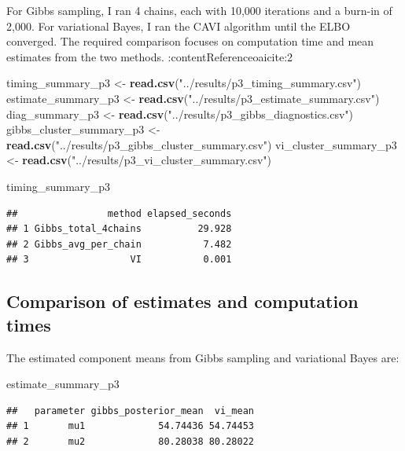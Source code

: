 \documentclass[
]{article}
\newenvironment{Shaded}{\begin{snugshade}}{\end{snugshade}}
\newcommand{\FunctionTok}[1]{\textcolor[rgb]{0.13,0.29,0.53}{\textbf{#1}}}
\newcommand{\NormalTok}[1]{#1}
\newcommand{\OtherTok}[1]{\textcolor[rgb]{0.56,0.35,0.01}{#1}}
\newcommand{\StringTok}[1]{\textcolor[rgb]{0.31,0.60,0.02}{#1}}
\begin{document}
For Gibbs sampling, I ran 4 chains, each with 10,000 iterations and a
burn-in of 2,000. For variational Bayes, I ran the CAVI algorithm until
the ELBO converged. The required comparison focuses on computation time
and mean estimates from the two methods. :contentReference{oaicite:2}

\begin{Shaded}
\begin{Highlighting}[]
\NormalTok{timing\_summary\_p3 }\OtherTok{\textless{}{-}} \FunctionTok{read.csv}\NormalTok{(}\StringTok{"../results/p3\_timing\_summary.csv"}\NormalTok{)}
\NormalTok{estimate\_summary\_p3 }\OtherTok{\textless{}{-}} \FunctionTok{read.csv}\NormalTok{(}\StringTok{"../results/p3\_estimate\_summary.csv"}\NormalTok{)}
\NormalTok{diag\_summary\_p3 }\OtherTok{\textless{}{-}} \FunctionTok{read.csv}\NormalTok{(}\StringTok{"../results/p3\_gibbs\_diagnostics.csv"}\NormalTok{)}
\NormalTok{gibbs\_cluster\_summary\_p3 }\OtherTok{\textless{}{-}} \FunctionTok{read.csv}\NormalTok{(}\StringTok{"../results/p3\_gibbs\_cluster\_summary.csv"}\NormalTok{)}
\NormalTok{vi\_cluster\_summary\_p3 }\OtherTok{\textless{}{-}} \FunctionTok{read.csv}\NormalTok{(}\StringTok{"../results/p3\_vi\_cluster\_summary.csv"}\NormalTok{)}

\NormalTok{timing\_summary\_p3}
\end{Highlighting}
\end{Shaded}

\begin{verbatim}
##                method elapsed_seconds
## 1 Gibbs_total_4chains          29.928
## 2 Gibbs_avg_per_chain           7.482
## 3                  VI           0.001
\end{verbatim}

\subsection{Comparison of estimates and computation
times}\label{comparison-of-estimates-and-computation-times}

The estimated component means from Gibbs sampling and variational Bayes
are:

\begin{Shaded}
\begin{Highlighting}[]
\NormalTok{estimate\_summary\_p3}
\end{Highlighting}
\end{Shaded}

\begin{verbatim}
##   parameter gibbs_posterior_mean  vi_mean
## 1       mu1             54.74436 54.74453
## 2       mu2             80.28038 80.28022
\end{verbatim}
\end{document}
